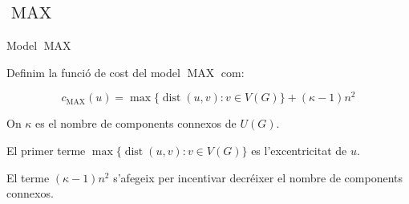 \documentclass[aspectratio=169]{beamer}
\DeclareMathOperator{\dist}{dist}
\DeclareMathOperator{\MAX}{MAX}
\begin{document}
\subsection{\texorpdfstring{$\MAX$}{MAX}}
\begin{frame}{Model $\MAX$}

Definim la funció de cost del model $\MAX$ com:

\begin{equation}
    c_{\MAX}(u) = \max \{ \dist(u, v) : v \in V(G) \} + (\kappa - 1)n^2
\end{equation}

On $\kappa$ es el nombre de components connexos de $U(G)$.

\vspace{2em}

El primer terme $\max \{ \dist(u, v) : v \in V(G) \}$ es l'excentricitat de $u$.

El terme $(\kappa - 1)n^2$ s'afegeix per incentivar decréixer el nombre de components connexos.

\end{frame}
\end{document}
